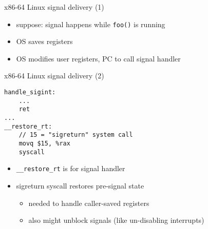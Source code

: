 \usetikzlibrary{arrows.meta,matrix}
\begin{frame}{x86-64 Linux signal delivery (1)}
\begin{itemize}
\item suppose: signal happens while {\tt foo()} is running
\item OS saves registers 
\item OS modifies user registers, PC to call signal handler
\end{itemize}
\end{frame}

\begin{frame}[fragile,label=sigReturn]{x86-64 Linux signal delivery (2)}
\begin{lstlisting}
handle_sigint:
    ...
    ret
...
__restore_rt:
    // 15 = "sigreturn" system call
    movq $15, %rax
    syscall
\end{lstlisting}
\begin{itemize}
\item {\tt \_\_restore\_rt} is  for signal handler
\item sigreturn syscall restores pre-signal state
\begin{itemize}
    \item needed to handle caller-saved registers
    \item also might unblock signals (like un-disabling interrupts)
\end{itemize}
\end{itemize}
\end{frame}


